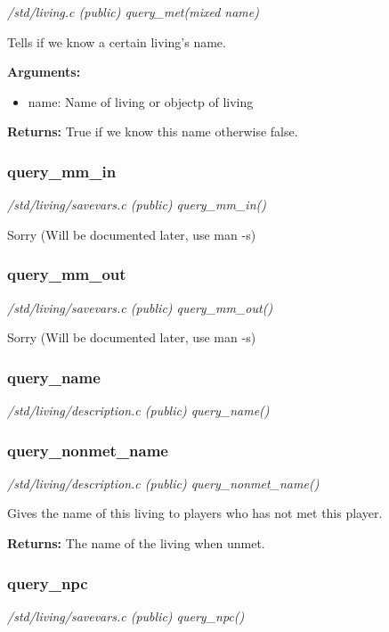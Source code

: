 {\em /std/living.c (public) query\_met(mixed name)}

Tells if we know a certain living's name.

{\bf Arguments:}
\begin{itemize}
\item      name: Name of living or objectp of living
\end{itemize}

{\bf Returns:}        True if we know this name otherwise false.


\subsubsection{query\_mm\_in}

{\em /std/living/savevars.c (public) query\_mm\_in()}

Sorry (Will be documented later, use man -s)


\subsubsection{query\_mm\_out}

{\em /std/living/savevars.c (public) query\_mm\_out()}

Sorry (Will be documented later, use man -s)


\subsubsection{query\_name}

{\em /std/living/description.c (public) query\_name()}



\subsubsection{query\_nonmet\_name}

{\em /std/living/description.c (public) query\_nonmet\_name()}

Gives the name of this living to players who has not met
this player.

{\bf Returns:}        The name of the living when unmet.


\subsubsection{query\_npc}

{\em /std/living/savevars.c (public) query\_npc()}


